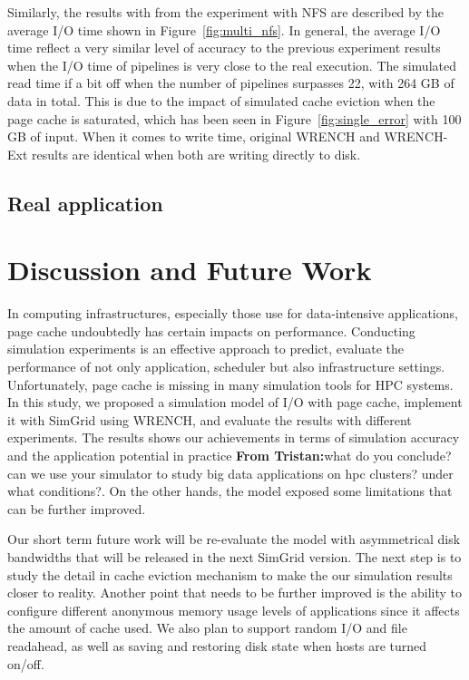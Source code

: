 \documentclass[conference]{IEEEtran}
\newcommand{\tristan}[1]{\color{orange}\textbf{From Tristan:}#1\color{black}}
\begin{document}
            Similarly, the results with from the experiment with NFS are described 
            by the average I/O time shown in Figure~\ref{fig:multi_nfs}.
            In general, the average I/O time reflect a very similar level of accuracy 
            to the previous experiment results when the I/O time of pipelines 
            is very close to the real execution. 
            The simulated read time if a bit off when the number of pipelines 
            surpasses 22, with 264 GB of data in total. 
            This is due to the impact of simulated cache eviction when 
            the page cache is saturated, which has been seen in 
            Figure~\ref{fig:single_error} with 100 GB of input. 
            When it comes to write time, original WRENCH and WRENCH-Ext 
            results are identical when both are writing directly to disk.
        
        \subsection{Real application}

    \section{Discussion and Future Work}
    \label{discussion}            
            In computing infrastructures, especially those use for data-intensive applications, 
            page cache undoubtedly has certain impacts on performance. 
            Conducting simulation experiments is an effective approach to predict, 
            evaluate the performance of not only application, scheduler but also 
            infrastructure settings. 
            Unfortunately, page cache is missing in many simulation tools for HPC systems. 
            In this study, we proposed a simulation model of I/O with page cache, 
            implement it with SimGrid using WRENCH, and evaluate the results 
            with different experiments. 
            The results shows our achievements in terms of simulation accuracy 
            and the application potential in practice \tristan{what do you conclude? can we use your simulator to study big data applications on hpc clusters? under what conditions?}. 
            On the other hands, the model exposed some limitations that can be 
            further improved.
            
            Our short term future work will be re-evaluate the model with asymmetrical 
            disk bandwidths that will be released in the next SimGrid version.
            The next step is to study the detail in cache eviction mechanism to make 
            the our simulation results closer to reality. 
            Another point that needs to be further improved is the ability to configure  
            different anonymous memory usage levels of applications since it affects  
            the amount of cache used.
            We also plan to support random I/O and file readahead, as well as 
            saving and restoring disk state when hosts are turned on/off.     



\end{document}
